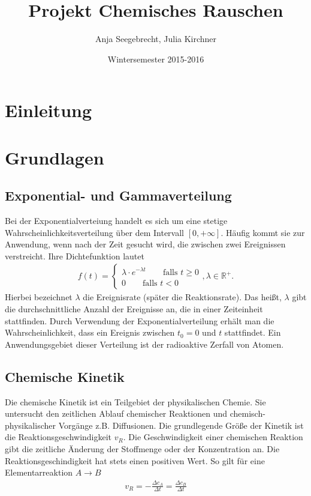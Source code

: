 \documentclass{scrartcl}
\title{Projekt Chemisches Rauschen}
\author{Anja Seegebrecht, Julia Kirchner}
\date{Wintersemester 2015-2016}
\begin{document}
\maketitle

\newpage

\tableofcontents

\newpage

\section{Einleitung}


\section{Grundlagen}
\subsection{Exponential- und Gammaverteilung}
Bei der Exponentialverteiung handelt es sich um eine stetige Wahrscheinlichkeitsverteilung über dem Intervall $[0, +\infty]$. Häufig kommt sie zur Anwendung, wenn nach der Zeit gesucht wird, die zwischen zwei Ereignissen verstreicht.
Ihre Dichtefunktion lautet
\begin{align*}
    f(t) = \begin{cases} \lambda \cdot e^{-\lambda t} \qquad \text{falls } t \geq 0 \\ 0 \qquad \text{falls } t < 0 \end{cases}, \lambda \in \mathbb{R}^+.
\end{align*}
Hierbei bezeichnet $\lambda$ die Ereignisrate (später die Reaktionsrate). Das heißt, $\lambda$ gibt die durchschnittliche Anzahl der Ereignisse an, die in einer Zeiteinheit stattfinden. Durch Verwendung der Exponentialverteilung erhält man die Wahrscheinlichkeit, dass ein Ereignis zwischen $t_0=0$ und $t$ stattfindet. Ein Anwendungsgebiet dieser Verteilung ist der radioaktive Zerfall von Atomen. %
\subsection{Chemische Kinetik}
Die chemische Kinetik ist ein Teilgebiet der physikalischen Chemie. Sie untersucht den zeitlichen Ablauf chemischer Reaktionen und chemisch-physikalischer Vorgänge z.B. Diffusionen. Die grundlegende Größe der Kinetik ist die Reaktionsgeschwindigkeit $v_R$. Die Geschwindigkeit einer chemischen Reaktion gibt die zeitliche Änderung der Stoffmenge oder der Konzentration an.
Die Reaktionsgeschindigkeit hat stets einen positiven Wert.
So gilt für eine Elementarreaktion  $A \rightarrow B$
\begin{align*}
     v_R = - \frac{\Delta c_A}{\Delta t} = \frac{\Delta c_B}{\Delta t}
\end{align*}
 
\end{document}
